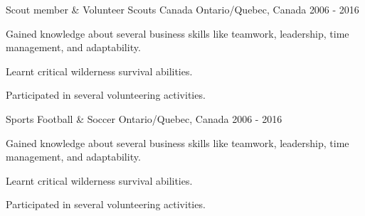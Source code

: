 

\begin{cventries}

  \cventry
    {Scout member \& Volunteer} %
    {Scouts Canada} %
    {Ontario/Quebec, Canada} %
    {2006 - 2016} %
    {
      \begin{cvitems} %
        \item {Gained knowledge about several business skills like teamwork, leadership, time management, and adaptability.}
        \item {Learnt critical wilderness survival abilities.}
        \item {Participated in several volunteering activities.}
      \end{cvitems}
    }

\cventry
{Sports} %
  {Football \& Soccer} %
  {Ontario/Quebec, Canada} %
  {2006 - 2016} %
  {
    \begin{cvitems} %
      \item {Gained knowledge about several business skills like teamwork, leadership, time management, and adaptability.}
      \item {Learnt critical wilderness survival abilities.}
      \item {Participated in several volunteering activities.}
    \end{cvitems}
  }

\end{cventries}
